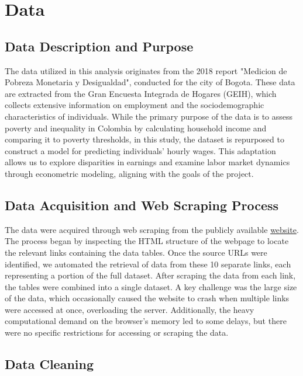 \documentclass[11pt,a4paper,onecolumn]{article}
\begin{document}
\section{Data}

    \subsection{Data Description and Purpose}
    
    The data utilized in this analysis originates from the 2018 report "Medicion de Pobreza Monetaria y Desigualdad", conducted for the city of Bogota. These data are extracted from the Gran Encuesta Integrada de Hogares (GEIH), which collects extensive information on employment and the sociodemographic characteristics of individuals. While the primary purpose of the data is to assess poverty and inequality in Colombia by calculating household income and comparing it to poverty thresholds, in this study, the dataset is repurposed to construct a model for predicting individuals' hourly wages. This adaptation allows us to explore disparities in earnings and examine labor market dynamics through econometric modeling, aligning with the goals of the project.

    \subsection{Data Acquisition and Web Scraping Process}

    The data were acquired through web scraping from the publicly available  \href{https://ignaciomsarmiento.github.io/GEIH2018_sample/}{website}. The process began by inspecting the HTML structure of the webpage to locate the relevant links containing the data tables. Once the source URLs were identified, we automated the retrieval of data from these 10 separate links, each representing a portion of the full dataset. After scraping the data from each link, the tables were combined into a single dataset. A key challenge was the large size of the data, which occasionally caused the website to crash when multiple links were accessed at once, overloading the server. Additionally, the heavy computational demand on the browser's memory led to some delays, but there were no specific restrictions for accessing or scraping the data.
    
    \subsection{Data Cleaning }
\end{document}
